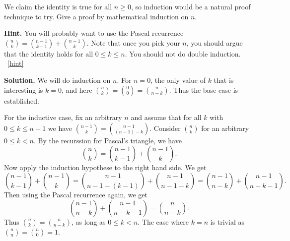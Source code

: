 \documentclass{book}
\begin{document}
\setcounter{project}{73}
\addtocounter{project}{-1}
\begin{activity}[]\label{activity-66}
\hypertarget{p-584}{}%
We claim the identity is true for all \(n \ge 0\), so induction would be a natural proof technique to try.  Give a proof by mathematical induction on \(n\).%
\par\smallskip%
\noindent\textbf{Hint.}\hypertarget{hint-28}{}\quad%
\hypertarget{p-585}{}%
You will probably want to use the Pascal recurrence \(\binom{n}{k} = \binom{n-1}{k-1} + \binom{n-1}{k}\).  Note that once you pick your \(n\), you should argue that the identity holds for all \(0 \le k \le n\).  You should not do double induction.%
~\hfill{\tiny\hyperlink{a-73}{[hint]}\hypertarget{q-73}{}}\par\smallskip%
\noindent\textbf{Solution.}\hypertarget{solution-55}{}\quad%
\hypertarget{p-586}{}%
We will do induction on \(n\).  For \(n = 0\), the only value of \(k\) that is interesting is \(k=0\), and here \(\binom{n}{k} = \binom{0}{0} = \binom{n}{n-k}\).  Thus the base case is established.%
\par
\hypertarget{p-587}{}%
For the inductive case, fix an arbitrary \(n\) and assume that for all \(k\) with \(0 \le k \le n-1\) we have \(\binom{n-1}{k} = \binom{n-1}{(n-1)-k}\).  Consider \(\binom{n}{k}\) for an arbitrary \(0 \le k \lt n\).  By the recurssion for Pascal's triangle, we have%
\begin{equation*}
\binom{n}{k} = \binom{n-1}{k-1} + \binom{n-1}{k}.
\end{equation*}
Now apply the induction hypothese to the right hand side.  We get%
\begin{equation*}
\binom{n-1}{k-1} + \binom{n-1}{k} = \binom{n-1}{n-1-(k-1)} + \binom{n-1}{n-1 -k} = \binom{n-1}{n-k} + \binom{n-1}{n-k-1}.
\end{equation*}
Then using the Pascal recurrence again, we get%
\begin{equation*}
\binom{n-1}{n-k} + \binom{n-1}{n-k-1} = \binom{n}{n-k}.
\end{equation*}
Thus \(\binom{n}{k} = \binom{n}{n-k}\), as long as \(0 \le k \lt n\).  The case where \(k = n\) is trivial as \(\binom{n}{n} = \binom{n}{0} = 1\).%
\end{activity}
\end{document}
